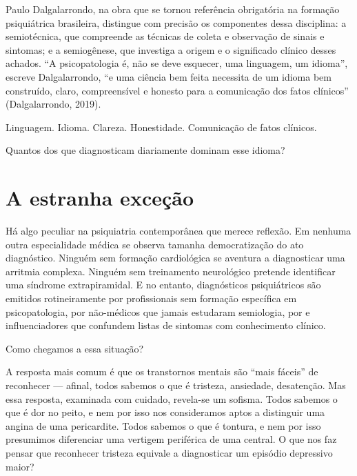 Paulo Dalgalarrondo, na obra que se tornou referência obrigatória na formação psiquiátrica brasileira, distingue com precisão os componentes dessa disciplina: a semiotécnica, que compreende as técnicas de coleta e observação de sinais e sintomas; e a semiogênese, que investiga a origem e o significado clínico desses achados. \enquote{A psicopatologia é, não se deve esquecer, uma linguagem, um idioma}, escreve Dalgalarrondo, \enquote{e uma ciência bem feita necessita de um idioma bem construído, claro, compreensível e honesto para a comunicação dos fatos clínicos} (Dalgalarrondo, 2019).

Linguagem. Idioma. Clareza. Honestidade. Comunicação de fatos clínicos.

Quantos dos que diagnosticam diariamente dominam esse idioma?

\section{A estranha exceção}
\label{sec:estranha-excecao}

Há algo peculiar na psiquiatria contemporânea que merece reflexão. Em nenhuma outra especialidade médica se observa tamanha democratização do ato diagnóstico. Ninguém sem formação cardiológica se aventura a diagnosticar uma arritmia complexa. Ninguém sem treinamento neurológico pretende identificar uma síndrome extrapiramidal. E no entanto, diagnósticos psiquiátricos são emitidos rotineiramente por profissionais sem formação específica em psicopatologia, por não-médicos que jamais estudaram semiologia, por  e influenciadores que confundem listas de sintomas com conhecimento clínico.

Como chegamos a essa situação?

A resposta mais comum é que os transtornos mentais são \enquote{mais fáceis} de reconhecer --- afinal, todos sabemos o que é tristeza, ansiedade, desatenção. Mas essa resposta, examinada com cuidado, revela-se um sofisma. Todos sabemos o que é dor no peito, e nem por isso nos consideramos aptos a distinguir uma angina de uma pericardite. Todos sabemos o que é tontura, e nem por isso presumimos diferenciar uma vertigem periférica de uma central. O que nos faz pensar que reconhecer tristeza equivale a diagnosticar um episódio depressivo maior?

